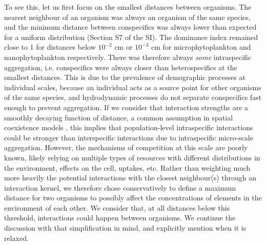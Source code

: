 \documentclass[12pt,english]{article}
\begin{document}
To see this, let us first focus on the smallest distances between
organisms. The nearest neighbour of an organism was always an organism
of the same species, and the minimum distance between conspecifics
was always lower than expected for a uniform distribution (Section
S7 of the SI). The dominance index remained close to 1 for distances
below $10^{-2}$ cm or $10^{-3}$ cm for microphytoplankton and nanophytoplankton
respectively. There was therefore always \emph{some} intraspecific
aggregation, i.e. conspecifics were always closer than heterospecifics
at the smallest distances. This is due to the prevalence of demographic
processes at individual scales, because an individual acts as a source
point for other organisms of the same species, and hydrodynamic processes
do not separate conspecifics fast enough to prevent aggregation. If
we consider that interaction strengths are a smoothly decaying function
of distance, a common assumption in spatial coexistence models \citep[e.g., ][]{bolker_spatial_1999,law_population_2003},
this implies that population-level intraspecific interactions could
be stronger than interspecific interactions due to intraspecific micro-scale
aggregation. However, the mechanisms of competition at this scale
are poorly known, likely relying on multiple types of resources with
different distributions in the environment, effects on the cell, uptakes,
etc. Rather than weighting much more heavily the potential interactions
with the closest neighbour(s) through an interaction kernel, we therefore
chose conservatively to define a maximum distance for two organisms
to possibly affect the concentrations of elements in the environment
of each other. We consider that, at all distances below this threshold,
interactions could happen between organisms. We continue the discussion
with that simplification in mind, and explicitly mention when it is
relaxed.
\end{document}
